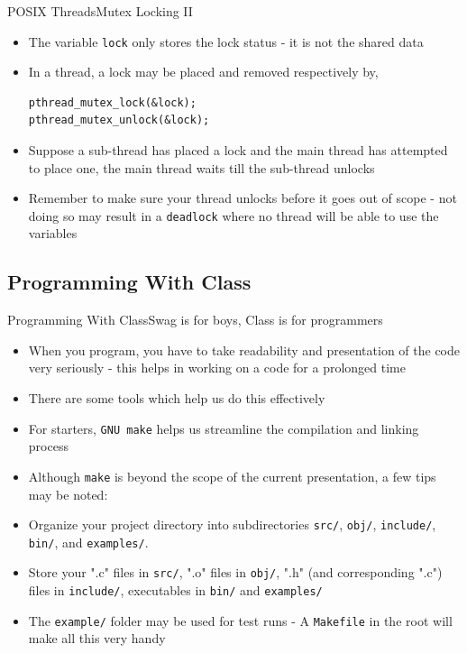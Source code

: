 \documentclass{beamer}
\begin{document}
\begin{frame}[fragile]{POSIX Threads}{Mutex Locking II}
  \begin{itemize}
    \item The variable \verb|lock| only stores the lock status - it is
      not the shared data
    \item In a thread, a lock may be placed and removed respectively
      by,
\begin{verbatim}
pthread_mutex_lock(&lock);
pthread_mutex_unlock(&lock);
\end{verbatim}
    \item Suppose a sub-thread has placed a lock and the main thread
      has attempted to place one, the main thread waits till the
      sub-thread unlocks
    \item Remember to make sure your thread unlocks before it goes out
      of scope - not doing so may result in a \verb|deadlock| where no
      thread will be able to use the variables
  \end{itemize}
\end{frame}
  
\subsection{Programming With Class}
\begin{frame}[fragile]{Programming With Class}{Swag is for boys, Class is for programmers}
\begin{itemize}
\item When you program, you have to take readability and presentation of the code very seriously - this helps in working on a code for a prolonged time
\item There are some tools which help us do this effectively
\item For starters, \verb|GNU make| helps us streamline the compilation and linking process
\item Although \verb|make| is beyond the scope of the current presentation, a few tips may be noted:
\item Organize your project directory into subdirectories \verb|src/|, \verb|obj/|, \verb|include/|, \verb|bin/|, and \verb|examples/|.
\item Store your ".c" files in \verb|src/|, ".o" files in \verb|obj/|, ".h" (and corresponding ".c") files in \verb|include/|, executables in \verb|bin/| and \verb|examples/|
\item The \verb|example/| folder may be used for test runs - A \verb|Makefile| in the root will make all this very handy
\end{itemize}
\end{frame}
\end{document}
